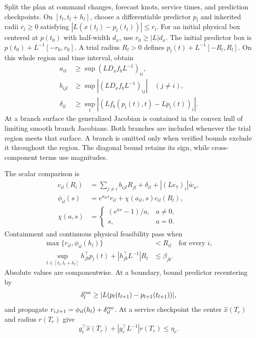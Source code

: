 \documentclass[preprint,12pt]{elsarticle}
\begin{document}
Split the plan at command changes, forecast knots, service times, and
prediction checkpoints. On $[t_l,t_l+h_l]$, choose a differentiable
predictor $p_l$ and inherited radii $r_l\ge0$ satisfying
$|L(x(t_l)-p_l(t_l))|\le r_l$. For an initial physical box centered at
$p(t_0)$ with half-width $d_x$, use $r_0\ge|L|d_x$. The initial predictor
box is $p(t_0)+L^{-1}[-r_0,r_0]$. A trial radius $R_l>0$ defines
$p_l(t)+L^{-1}[-R_l,R_l]$. On this whole region and time interval, obtain
\begin{equation}
 \begin{aligned}
 a_{il}&\ge\sup (L D_xf_b L^{-1})_{ii},\\
 b_{ijl}&\ge\sup |(L D_xf_b L^{-1})_{ij}|\quad(j\ne i),\\
 \delta_{il}&\ge\sup_t |(L f_b(p_l(t),t)-L\dot p_l(t))_i|.
 \end{aligned}
 \label{eq:new-local-bounds}
\end{equation}
At a branch surface the generalized Jacobian is contained in the convex
hull of limiting smooth branch Jacobians. Both branches are included
whenever the trial region meets that surface. A branch is omitted only
when verified bounds exclude it throughout the region. The diagonal bound
retains its sign, while cross-component terms use magnitudes.

The scalar comparison is
\begin{align}
 c_{il}(R_l)&=\sum_{j\ne i}b_{ijl}R_{jl}
                  +\delta_{il}+|(Le_7)_i|\bar w_x,\nonumber\\
 \phi_{il}(s)&=e^{a_{il}s}r_{il}
                   +\chi(a_{il},s)c_{il}(R_l),\nonumber\\
 \chi(a,s)&=\begin{cases}(e^{as}-1)/a,&a\ne0,\\s,&a=0.\end{cases}
 \label{eq:new-component-comparison}
\end{align}
Containment and continuous physical feasibility pass when
\begin{align}
 \max\{r_{il},\phi_{il}(h_l)\}&<R_{il}\quad\text{for every }i,
 \label{eq:new-self-inclusion}\\
 \sup_{t\in[t_l,t_l+h_l]}h_{jb}^\top p_l(t)
       +|h_{jb}^\top L^{-1}|R_l&\le\beta_{jb}.
 \label{eq:new-affine-support}
\end{align}
Absolute values are componentwise. At a boundary, bound predictor recentering by
\begin{equation}
 \delta^{\rm rec}_l\ge
 |L(p_l(t_{l+1})-p_{l+1}(t_{l+1}))|,
 \label{eq:new-recentering-bound}
\end{equation}
and propagate $r_{i,l+1}=\phi_{il}(h_l)+\delta^{\rm rec}_{il}$. At a service
checkpoint the center $\widehat x(T_r)$ and radius $r(T_r)$ give
\begin{equation}
 g_r^\top\widehat x(T_r)+|g_r^\top L^{-1}|r(T_r)\le\eta_r.
 \label{eq:new-service-support}
\end{equation}
\end{document}
